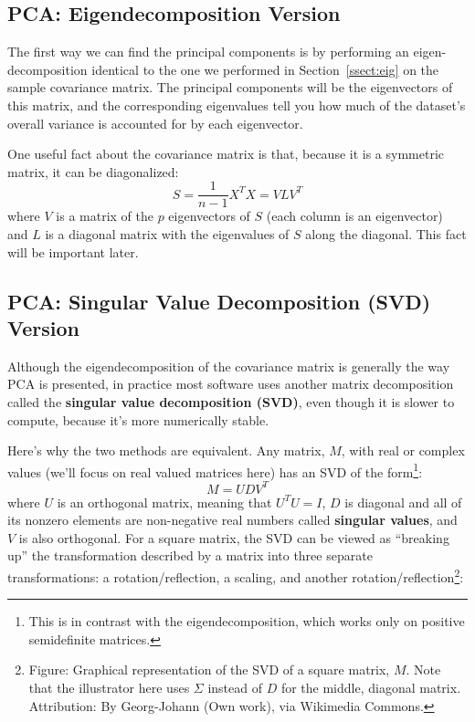 \subsection{PCA: Eigendecomposition Version} 

The first way we can find the principal components is by performing an eigen-decomposition identical to the one we performed in Section~\ref{ssect:eig} on the sample covariance matrix. The principal components will be the eigenvectors of this matrix, and the corresponding eigenvalues tell you how much of the dataset's overall variance is accounted for by each eigenvector.

One useful fact about the covariance matrix is that, because it is a symmetric matrix, it can be diagonalized:
\begin{equation} S = \frac{1}{n-1} X^T X = V L V^T \label{eqn:eigendiag} \end{equation}
where $V$ is a matrix of the $p$ eigenvectors of $S$ (each column is an eigenvector) and $L$ is a diagonal matrix with the eigenvalues of $S$ along the diagonal. This fact will be important later.

\subsection{PCA: Singular Value Decomposition (SVD) Version}

Although the eigendecomposition of the covariance matrix is generally the way PCA is presented, in practice most software uses another matrix decomposition called the \textbf{singular value decomposition (SVD)}, even though it is slower to compute, because it's more numerically stable.

Here's why the two methods are equivalent. Any matrix, $M$, with real or complex values (we'll focus on real valued matrices here) has an SVD of the form\footnote{This is in contrast with the eigendecomposition, which works only on positive semidefinite matrices.}:
$$ M = U D V^T $$
where $U$ is an orthogonal matrix, meaning that $U^TU = I$, $D$ is diagonal and all of its nonzero elements are non-negative real numbers called \textbf{singular values}, and $V$ is also orthogonal. For a square matrix, the SVD can be viewed as ``breaking up'' the transformation described by a matrix into three separate transformations: a rotation/reflection, a scaling, and another rotation/reflection\footnote{Figure: Graphical representation of the SVD of a square matrix, $M$. Note that the illustrator here uses $\Sigma$ instead of $D$ for the middle, diagonal matrix. Attribution: By Georg-Johann (Own work), via Wikimedia Commons.}:


